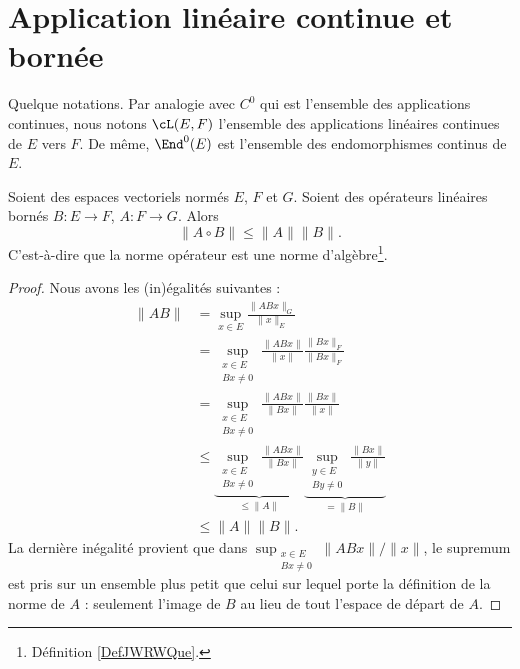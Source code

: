 \section{Application linéaire continue et bornée}

\begin{normaltext}		\label{NORMooUKURooIkcRoS}
	Quelque notations. Par analogie avec \( C^0\) qui est l'ensemble des applications continues, nous notons \( \cL(E,F)\) l'ensemble des applications linéaires continues de \( E\) vers \( F\). De même, \( \End^0(E)\) est l'ensemble des endomorphismes continus de \( E\).
\end{normaltext}


\begin{lemma}   \label{LEMooFITMooBBBWGI}
	Soient des espaces vectoriels normés \( E\), \( F\) et \( G\). Soient des opérateurs linéaires bornés \( B\colon E\to F\), \( A\colon F\to G\). Alors
	\begin{equation}
		\| A\circ B \|\leq \| A \|\| B \|.
	\end{equation}
	C'est-à-dire que la norme opérateur est une norme d'algèbre\footnote{Définition \ref{DefJWRWQue}.}.
\end{lemma}

\begin{proof}
	Nous avons les (in)égalités suivantes :
	\begin{subequations}
		\begin{align}
			\| AB \| & =\sup_{x\in E}\frac{ \| ABx \|_G }{ \| x \|_E } \\
			         & =\sup_{\substack{x\in E                         \\Bx\neq 0}}\frac{ \| ABx \| }{ \| x \| }\frac{ \| Bx \|_F }{ \| Bx \|_F }\\
			         & =\sup_{\substack{x\in E                         \\Bx\neq 0}}\frac{ \| ABx \| }{ \| Bx \| }\frac{ \| Bx \| }{ \| x \| }\\
			         & \leq\underbrace{\sup_{\substack{x\in E          \\Bx\neq 0}}\frac{ \| ABx \| }{ \| Bx \| }}_{\leq\| A \|}\underbrace{\sup_{\substack{y\in E\\By\neq 0}}\frac{ \| Bx \| }{ \| y \| }}_{=\| B \|}\\
			         & \leq \| A \|\| B \|.
		\end{align}
	\end{subequations}
	La dernière inégalité provient que dans \( \sup_{\substack{x\in E\\Bx\neq 0}}\| ABx \|/\| x \|\), le supremum est pris sur un ensemble plus petit que celui sur lequel porte la définition de la norme de \( A\) : seulement l'image de \( B\) au lieu de tout l'espace de départ de \( A\).
\end{proof}

